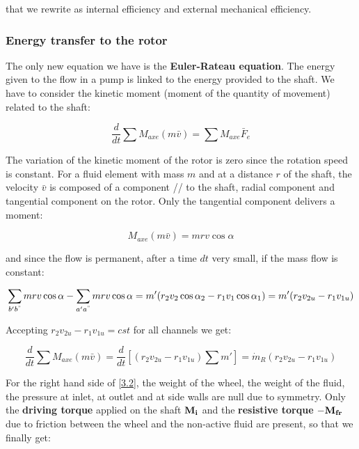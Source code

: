 that we rewrite as internal efficiency and external mechanical efficiency. 

\subsubsection{Energy transfer to the rotor}
The only new equation we have is the \textbf{Euler-Rateau equation}. The energy given to the flow in a pump is linked to the energy provided to the shaft. We have to consider the kinetic moment (moment of the quantity of movement) related to the shaft:

\begin{equation}
\frac{d}{dt}\sum M_{axe} (m\bar{v}) = \sum M_{axe}\bar{F}_e
\label{3.2}
\end{equation}

The variation of the kinetic moment of the rotor is zero since the rotation speed is constant. For a fluid element with mass $m$ and at a distance $r$ of the shaft, the velocity $\bar{v}$ is composed of a component // to the shaft, radial component and tangential component on the rotor. Only the tangential component delivers a moment: 

\begin{equation}
M_{axe}(m\bar{v}) = m r v \cos \alpha 
\end{equation}

and since the flow is permanent, after a time $dt$ very small, if the mass flow is constant: 

\begin{equation}
\sum _{b'b^"} mr v \cos \alpha - \sum _{a'a^"} mr v \cos \alpha = m' (r_2v_2\cos \alpha _2-r_1v_1\cos \alpha _1) = m' (r_2 v_{2u} - r_1 v_{1u})
\end{equation}

Accepting $r_2 v_{2u} - r_1 v_{1u} = cst$ for all channels we get: 

\begin{equation}
\frac{d}{dt}\sum M_{axe}(m\bar{v}) = \frac{d}{dt}\left[(r_2 v_{2u} - r_1 v_{1u}) \sum m'\right] = \dot{m}_R (r_2 v_{2u} - r_1 v_{1u})
\end{equation}

For the right hand side of \eqref{3.2}, the weight of the wheel, the weight of the fluid, the pressure at inlet, at outlet and at side walls are null due to symmetry. Only the \textbf{driving torque} applied on the shaft $\bf{M_i}$ and the \textbf{resistive torque} $-\bf{M_{fr}}$ due to friction between the wheel and the non-active fluid are present, so that we finally get: 

